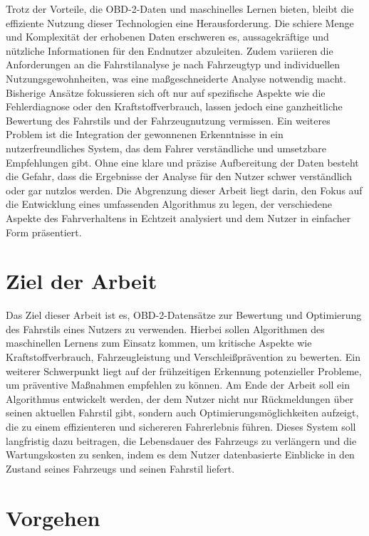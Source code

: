 \documentclass[oneside]{ausarbeitung}
\begin{document}
Trotz der Vorteile, die OBD-2-Daten und maschinelles Lernen bieten, bleibt die effiziente Nutzung dieser Technologien eine Herausforderung. Die schiere Menge und Komplexität der erhobenen Daten erschweren es, aussagekräftige und nützliche Informationen für den Endnutzer abzuleiten. Zudem variieren die Anforderungen an die Fahrstilanalyse je nach Fahrzeugtyp und individuellen Nutzungsgewohnheiten, was eine maßgeschneiderte Analyse notwendig macht. Bisherige Ansätze fokussieren sich oft nur auf spezifische Aspekte wie die Fehlerdiagnose oder den Kraftstoffverbrauch, lassen jedoch eine ganzheitliche Bewertung des Fahrstils und der Fahrzeugnutzung vermissen.
Ein weiteres Problem ist die Integration der gewonnenen Erkenntnisse in ein nutzerfreundliches System, das dem Fahrer verständliche und umsetzbare Empfehlungen gibt. Ohne eine klare und präzise Aufbereitung der Daten besteht die Gefahr, dass die Ergebnisse der Analyse für den Nutzer schwer verständlich oder gar nutzlos werden. Die Abgrenzung dieser Arbeit liegt darin, den Fokus auf die Entwicklung eines umfassenden Algorithmus zu legen, der verschiedene Aspekte des Fahrverhaltens in Echtzeit analysiert und dem Nutzer in einfacher Form präsentiert.

\section{Ziel der Arbeit}
\label{sec:ziel}

Das Ziel dieser Arbeit ist es, OBD-2-Datensätze zur Bewertung und Optimierung des Fahrstils eines Nutzers zu verwenden. Hierbei sollen Algorithmen des maschinellen Lernens zum Einsatz kommen, um kritische Aspekte wie Kraftstoffverbrauch, Fahrzeugleistung und Verschleißprävention zu bewerten. Ein weiterer Schwerpunkt liegt auf der frühzeitigen Erkennung potenzieller Probleme, um präventive Maßnahmen empfehlen zu können. Am Ende der Arbeit soll ein Algorithmus entwickelt werden, der dem Nutzer nicht nur Rückmeldungen über seinen aktuellen Fahrstil gibt, sondern auch Optimierungsmöglichkeiten aufzeigt, die zu einem effizienteren und sichereren Fahrerlebnis führen. Dieses System soll langfristig dazu beitragen, die Lebensdauer des Fahrzeugs zu verlängern und die Wartungskosten zu senken, indem es dem Nutzer datenbasierte Einblicke in den Zustand seines Fahrzeugs und seinen Fahrstil liefert.

\section{Vorgehen}
\label{sec:vorgehen}
\end{document}
